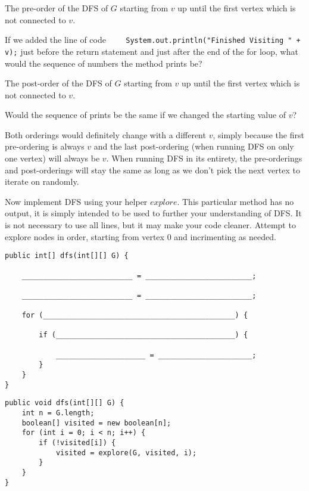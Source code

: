 \vspace{35mm}

\begin{solution}
The pre-order of the DFS of $G$ starting from $v$ up until the first vertex which is not connected to $v$. 
\end{solution}

\question If we added the line of code \lstinline{    System.out.println("Finished Visiting " + v);} just before the return statement and just after the end of the for loop, what would the sequence of numbers the method prints be?

\vspace{25mm}

\begin{solution}
The post-order of the DFS of $G$ starting from $v$ up until the first vertex which is not connected to $v$. 
\end{solution}

\question Would the sequence of prints be the same if we changed the starting value of $v$?

\vspace{25mm}

\begin{solution}
Both orderings would definitely change with a different $v$, simply because the first pre-ordering is always $v$ and the last post-ordering (when running DFS on only one vertex) will always be $v$. When running DFS in its entirety, the pre-orderings and post-orderings will stay the same as long as we don't pick the next vertex to iterate on randomly. 
\end{solution}

\question Now implement DFS using your helper $explore$. This particular method has no output, it is simply intended to be used to further your understanding of DFS. It is not necessary to use all lines, but it may make your code cleaner. Attempt to explore nodes in order, starting from vertex $0$ and incrimenting as needed.

\begin{lstlisting}
public int[] dfs(int[][] G) {

    __________________________ = _________________________;
    
    __________________________ = _________________________;
    
    for (_____________________________________________) {
    
        if (__________________________________________) {
        
            _____________________ = ______________________;
        }
    }
}   
\end{lstlisting}

\begin{solution}
\begin{lstlisting}
public void dfs(int[][] G) {
    int n = G.length;
    boolean[] visited = new boolean[n];
    for (int i = 0; i < n; i++) {
        if (!visited[i]) {
            visited = explore(G, visited, i);
        }
    }
}    
\end{lstlisting}
\end{solution}